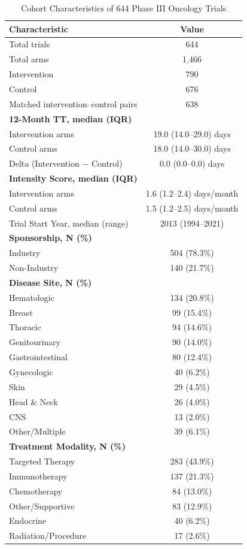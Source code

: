 \documentclass[11pt,a4paper]{article}
\begin{document}
\begin{table}[H]
\centering
\caption{Cohort Characteristics of 644 Phase III Oncology Trials}
\label{tab:cohort}
\begin{tabular}{lc}
\toprule
\textbf{Characteristic} & \textbf{Value} \\
\midrule
Total trials & 644 \\
Total arms & 1{,}466 \\
\quad Intervention & 790 \\
\quad Control & 676 \\
Matched intervention--control pairs & 638 \\
\addlinespace
\textbf{12-Month TT, median (IQR)} & \\
\quad Intervention arms & 19.0 (14.0--29.0) days \\
\quad Control arms & 18.0 (14.0--30.0) days \\
\quad Delta (Intervention $-$ Control) & 0.0 (0.0--0.0) days \\
\addlinespace
\textbf{Intensity Score, median (IQR)} & \\
\quad Intervention arms & 1.6 (1.2--2.4) days/month \\
\quad Control arms & 1.5 (1.2--2.5) days/month \\
\addlinespace
Trial Start Year, median (range) & 2013 (1994--2021) \\
\addlinespace
\textbf{Sponsorship, N (\%)} & \\
\quad Industry & 504 (78.3\%) \\
\quad Non-Industry & 140 (21.7\%) \\
\addlinespace
\textbf{Disease Site, N (\%)} & \\
\quad Hematologic & 134 (20.8\%) \\
\quad Breast & 99 (15.4\%) \\
\quad Thoracic & 94 (14.6\%) \\
\quad Genitourinary & 90 (14.0\%) \\
\quad Gastrointestinal & 80 (12.4\%) \\
\quad Gynecologic & 40 (6.2\%) \\
\quad Skin & 29 (4.5\%) \\
\quad Head \& Neck & 26 (4.0\%) \\
\quad CNS & 13 (2.0\%) \\
\quad Other/Multiple & 39 (6.1\%) \\
\addlinespace
\textbf{Treatment Modality, N (\%)} & \\
\quad Targeted Therapy & 283 (43.9\%) \\
\quad Immunotherapy & 137 (21.3\%) \\
\quad Chemotherapy & 84 (13.0\%) \\
\quad Other/Supportive & 83 (12.9\%) \\
\quad Endocrine & 40 (6.2\%) \\
\quad Radiation/Procedure & 17 (2.6\%) \\
\bottomrule
\end{tabular}
\end{table}
\end{document}
